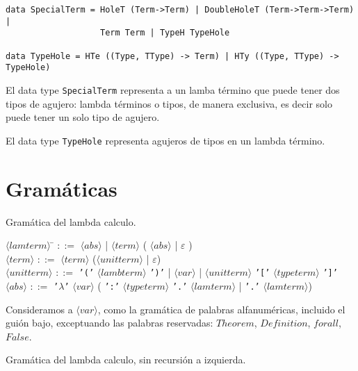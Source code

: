 \documentclass[a4paper,11pt]{article}
\theoremstyle{definition}
\begin{document}
\begin{verbatim}
data SpecialTerm = HoleT (Term->Term) | DoubleHoleT (Term->Term->Term) |
                   Term Term | TypeH TypeHole

data TypeHole = HTe ((Type, TType) -> Term) | HTy ((Type, TType) -> TypeHole)
\end{verbatim}

El data type \texttt{SpecialTerm} representa a un lamba término que puede tener dos tipos de agujero: lambda términos o tipos, de manera
exclusiva, es decir solo puede tener un solo tipo de agujero.

El data type \texttt{TypeHole} representa agujeros de tipos en un lambda término.

\section{Gramáticas}
 Gramática del lambda calculo.

\begin{tabbing}
$\langle lamterm \rangle$ \= $::=$ $\langle abs \rangle$ | $\langle term \rangle$ ( $\langle abs \rangle$ | $\varepsilon$ ) \\

$\langle term \rangle$ \> $::=$ $\langle term \rangle$ ($\langle unitterm \rangle$ | $\varepsilon$) \\

$\langle unitterm \rangle$ \> $::=$ \texttt{'('} $\langle lambterm \rangle$ \texttt{')'} |
$\langle var \rangle$ | $\langle unitterm \rangle$ \texttt{'['} $\langle typeterm \rangle$ \texttt{']'}\\

$\langle abs \rangle$ \> $::=$ \texttt{'$\lambda$'} $\langle var \rangle$ ( \texttt{':'} $\langle typeterm \rangle$ \texttt{'.'} $\langle lamterm \rangle$
| \texttt{'.'} $\langle lamterm \rangle$)
\end{tabbing}

Consideramos a $\langle var \rangle$, como la gramática de palabras alfanuméricas, incluido el guión bajo, exceptuando
las palabras reservadas: $Theorem$, $Definition$, $forall$, $False$.

Gramática del lambda calculo, sin recursión a izquierda.
\end{document}
